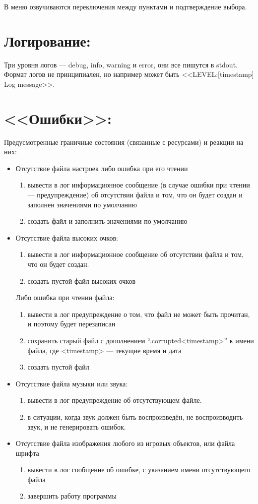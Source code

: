 \documentclass[12pt,a4paper,fullpage]{article}
\begin{document}
В меню озвучиваются переключения между пунктами и подтверждение выбора.\\

\section{Логирование:}
Три уровня логов --- debug, info, warning и error, они все пишутся в stdout. Формат логов не принципиален, но например может быть <<LEVEL:[timestamp] Log message>>.\\

\section{<<Ошибки>>:}
Предусмотренные граничные состояния (связанные с ресурсами) и реакции на них:
\begin{itemize}
\item Отсутствие файла настроек либо ошибка при его чтении
  \begin{enumerate}
  \item вывести в лог информационное сообщение (в случае ошибки при чтении --- предупреждение) об отсутствии файла и том, что он будет создан и заполнен значениями по умолчанию
  \item создать файл и заполнить значениями по умолчанию
  \end{enumerate}
\item Отсутствие файла высоких очков:
  \begin{enumerate}
  \item вывести в лог информационное сообщение об отсутствии файла и том, что он будет создан.
  \item создать пустой файл высоких очков
  \end{enumerate}
  Либо ошибка при чтении файла:
  \begin{enumerate}
  \item вывести в лог предупреждение о том, что файл не может быть прочитан, и поэтому будет перезаписан
  \item сохранить старый файл с дополнением ``.corrupted<timestamp>'' к имени файла, где <timestamp> --- текущие время и дата
  \item создать пустой файл
  \end{enumerate}
\item Отсутствие файла музыки или звука:
  \begin{enumerate}
  \item вывести в лог предупреждение об отсутствующем файле.
  \item в ситуации, когда звук должен быть воспроизведён, не воспроизводить звук, и не генерировать ошибок.
  \end{enumerate}
\item Отсутствие файла изображения любого из игровых объектов, или файла шрифта
  \begin{enumerate}
  \item вывести в лог сообщение об ошибке, с указанием имени отсутствующего файла
  \item завершить работу программы
  \end{enumerate}
\end{itemize}
\end{document}
